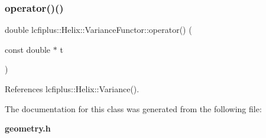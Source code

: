 \subsubsection{operator()()}
{\footnotesize\ttfamily double lcfiplus\+::\+Helix\+::\+Variance\+Functor\+::operator() (\begin{DoxyParamCaption}\item[{const double $\ast$}]{t }\end{DoxyParamCaption})\hspace{0.3cm}{\ttfamily [inline]}}



References lcfiplus\+::\+Helix\+::\+Variance().



The documentation for this class was generated from the following file\+:\begin{DoxyCompactItemize}
\item 
\textbf{ geometry.\+h}\end{DoxyCompactItemize}
